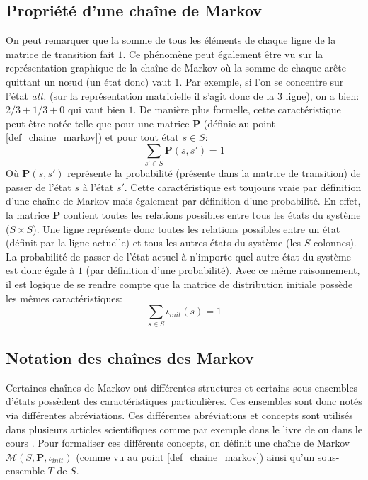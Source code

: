 \documentclass[letterpaper]{article}
\begin{document}
  \subsection{Propriété d'une chaîne de Markov}
    On peut remarquer que la somme de tous les éléments de chaque ligne de la
    matrice de transition fait $1$.  Ce phénomène peut également être vu
    sur la représentation graphique de la chaîne de Markov où la somme de chaque
    arête quittant un nœud (un état donc) vaut $1$.  Par exemple, si l'on se
    concentre sur l'état \textit{att.} (sur la représentation matricielle il s'agit donc
    de la 3 ligne), on a bien: $2/3 + 1/3 + 0$ qui vaut bien $1$.  De manière
    plus formelle, cette caractéristique peut être notée telle que pour une matrice
    $\mathbf{P}$ (définie au point \ref{def_chaine_markov}) et pour tout état $s \in S$:
    $$\sum\limits_{s' \in S} \mathbf{P}(s, s') = 1$$
    Où $\mathbf{P}(s, s')$ représente la probabilité (présente dans la matrice de
    transition) de passer de l'état $s$ à l'état $s'$.  Cette caractéristique est
    toujours vraie par définition d'une chaîne de Markov mais également par définition
    d'une probabilité.
    En effet, la matrice $\mathbf{P}$ contient toutes les relations possibles entre
    tous les états du système ($S \times S$).  Une ligne représente donc toutes les
    relations possibles entre un état (définit par la ligne actuelle) et tous les autres
    états du système (les $S$ colonnes).  La probabilité de passer de l'état actuel
    à n'importe quel autre état du système est donc égale à $1$ (par définition d'une probabilité).
    Avec ce même raisonnement, il est logique de se rendre compte que la matrice
    de distribution initiale possède les mêmes caractéristiques:
    $$\sum\limits_{s \in S} \iota_{init}(s) = 1$$

  \subsection{Notation des chaînes des Markov}
    Certaines chaînes de Markov ont différentes structures et certains
    sous-ensembles d'états possèdent des caractéristiques particulières.
    Ces ensembles sont donc notés via différentes abréviations.  Ces différentes
    abréviations et concepts sont utilisés dans plusieurs articles scientifiques
    comme par exemple dans le livre de \citet{ModelChecking} ou dans le cours
    \citet{COURS}.  Pour formaliser ces différents concepts, on définit
    une chaîne de Markov $\mathcal{M}(S, \mathbf{P}, \iota_{init})$
    (comme vu au point \ref{def_chaine_markov}) ainsi qu'un sous-ensemble $T$ de $S$.
\end{document}
